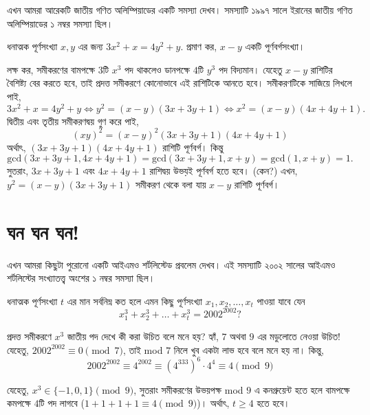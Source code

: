 \documentclass[11pt]{report}
\begin{document}
এখন আমরা আরেকটি জাতীয় গণিত অলিম্পিয়াডের একটি সমস্যা দেখব। সমস্যাটি ১৯৯৭ সালে ইরানের জাতীয় গণিত অলিম্পিয়াডের ১ নম্বর সমস্যা ছিল।\\

\begin{tcolorbox}[colframe=black!80!green,title=Iran 2nd Round 1997]
ধনাত্মক পূর্ণসংখ্যা $x,y$ এর জন্য $3x^2+x=4y^2+y$. প্রমাণ কর, $x-y$ একটি পূর্ণবর্গসংখ্যা।
\end{tcolorbox}

লক্ষ কর, সমীকরণের বামপক্ষে $3$টি $x^3$ পদ থাকলেও ডানপক্ষে $4$টি $y^3$ পদ বিদ্যমান। যেহেতু $x-y$ রাশিটির বৈশিষ্ট্য বের করতে হবে, তাই প্রদত্ত সমীকরণে কোনোভাবে এই রাশিটিকে আনতে হবে। সমীকরণটিকে সাজিয়ে লিখলে পাই, $$3x^2+x=4y^2+y \iff y^2 = (x-y)(3x+3y+1) \iff x^2 = (x-y)(4x+4y+1).$$ দ্বিতীয় এবং তৃতীয় সমীকরণদ্বয় গুণ করে পাই, $$(xy)^2 = (x-y)^2(3x+3y+1)(4x+4y+1)$$ অর্থাৎ, $(3x+3y+1)(4x+4y+1)$ রাশিটি পূর্ণবর্গ। কিন্তু $$\text{gcd}(3x+3y+1,4x+4y+1) = \text{gcd}(3x+3y+1,x+y) = \text{gcd}(1,x+y)=1.$$ সুতরাং, $3x+3y+1$ এবং $4x+4y+1$ রাশিদ্বয় উভয়ই পূর্ণবর্গ হতে হবে। (কেন?) এখন, $y^2 = (x-y)(3x+3y+1)$ সমীকরণ থেকে বলা যায় $x-y$ রাশিটি পূর্ণবর্গ।\\

\section{ঘন ঘন ঘন!}

এখন আমরা কিছুটা পুরোনো একটি আইএমও শর্টলিস্টেড প্রবলেম দেখব। এই সমস্যাটি ২০০২ সালের আইএমও শর্টলিস্টের সংখ্যাতত্ত্ব অংশের ১ নম্বর সমস্যা ছিল।\\

\begin{tcolorbox}[colframe=black!80!green,title=IMO SL 2002]
ধনাত্মক পূর্ণসংখ্যা $t$ এর মান সর্বনিম্ন কত হলে এমন কিছু পূর্ণসংখ্যা $x_1, x_2, \ldots, x_t$ পাওয়া যাবে যেন $$x_1^3+x_2^3+\ldots+x_t^3=2002^{2002} ?$$
\end{tcolorbox}

প্রদত্ত সমীকরণে $x^3$ জাতীয় পদ দেখে কী করা উচিত বলে মনে হয়? হ্যাঁ, $7$ অথবা $9$ এর মডুলোতে নেওয়া উচিত! যেহেতু, $2002^{2002} \equiv 0 \pmod{7}$, তাই mod $7$ নিলে খুব একটা লাভ হবে বলে মনে হয় না। কিন্তু, $$2002^{2002} \equiv 4^{2002} \equiv (4^{333})^6 \cdot 4^4 \equiv 4 \pmod{9}$$

যেহেতু, $x^3 \in \{-1,0,1\} \pmod{9}$, সুতরাং সমীকরণের উভয়পক্ষ mod $9$ এ কনগ্রুয়েন্ট হতে হলে বামপক্ষে কমপক্ষে $4$টি পদ লাগবে ($1+1+1+1 \equiv 4 \pmod{9}$)। অর্থাৎ, $t \geq 4$ হতে হবে।\\
\end{document}
